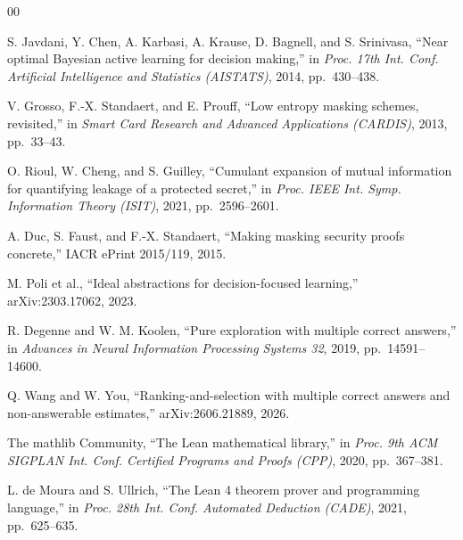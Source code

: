 \begin{thebibliography}{00}

 S. Javdani, Y. Chen, A. Karbasi, A. Krause, D. Bagnell, and
S. Srinivasa, ``Near optimal Bayesian active learning for decision making,'' in
\emph{Proc. 17th Int. Conf. Artificial Intelligence and Statistics (AISTATS)}, 2014,
pp.~430--438.

 V. Grosso, F.-X. Standaert, and E. Prouff, ``Low entropy masking
schemes, revisited,'' in \emph{Smart Card Research and Advanced Applications (CARDIS)},
2013, pp.~33--43.

 O. Rioul, W. Cheng, and S. Guilley, ``Cumulant expansion of mutual
information for quantifying leakage of a protected secret,'' in \emph{Proc. IEEE Int. Symp.
Information Theory (ISIT)}, 2021, pp.~2596--2601.

 A. Duc, S. Faust, and F.-X. Standaert, ``Making masking security
proofs concrete,'' IACR ePrint 2015/119, 2015.

 M. Poli et al., ``Ideal abstractions for decision-focused learning,''
arXiv:2303.17062, 2023.

 R. Degenne and W. M. Koolen, ``Pure exploration with multiple correct
answers,'' in \emph{Advances in Neural Information Processing Systems 32}, 2019,
pp.~14591--14600.

 Q. Wang and W. You, ``Ranking-and-selection with multiple correct
answers and non-answerable estimates,'' arXiv:2606.21889, 2026.

 The mathlib Community, ``The Lean mathematical library,'' in
\emph{Proc. 9th ACM SIGPLAN Int. Conf. Certified Programs and Proofs (CPP)}, 2020,
pp.~367--381.

 L. de Moura and S. Ullrich, ``The Lean 4 theorem prover and
programming language,'' in \emph{Proc. 28th Int. Conf. Automated Deduction (CADE)}, 2021,
pp.~625--635.

\end{thebibliography}


